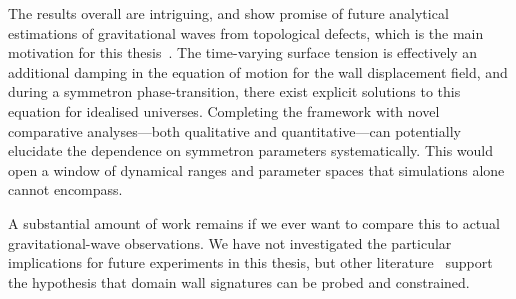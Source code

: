 

    The results overall are intriguing, and show promise of future 
    {analytical estimations of gravitational waves from topological defects}, 
    which is the main motivation for this thesis~\citep{saikawaReviewGravitationalWaves2017}. %
    The time-varying surface tension is effectively an additional damping in the equation of motion for the wall displacement field, and during a symmetron phase-transition, there exist explicit solutions to this equation for idealised universes. Completing the framework with novel comparative analyses---both qualitative and quantitative---can potentially elucidate the dependence on symmetron parameters systematically. This would open a window of dynamical ranges and parameter spaces that simulations alone cannot encompass.



    A substantial amount of work remains if we ever want to compare this to actual gravitational-wave observations. We have not investigated the particular implications for future experiments in this thesis, but other literature~\citep{ferreiraGravitationalWavesDomain2023,clementsDetectingDarkDomain2023,paulGravitationalWaveSignatures2021,nakayamaGravitationalWavesDomain2017,hiramatsuEstimationGravitationalWave2014,hiramatsuGravitationalWavesCollapsing2010} support the hypothesis that domain wall signatures can be probed and constrained. 









